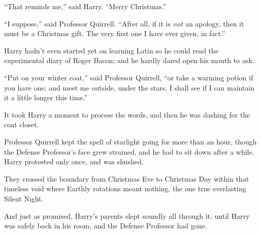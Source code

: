 “That reminds me,” said Harry. “Merry Christmas.”

“I suppose,” said Professor Quirrell. “After all, if it is \emph{not} an apology, then it must be a Christmas gift. The very first one I have ever given, in fact.”

Harry hadn’t even started yet on learning Latin so he could read the experimental diary of Roger Bacon; and he hardly dared open his mouth to ask.

“Put on your winter coat,” said Professor Quirrell, “or take a warming potion if you have one; and meet me outside, under the stars. I shall see if I can maintain it a little longer this time.”

It took Harry a moment to process the words, and then he was dashing for the coat closet.

Professor Quirrell kept the spell of starlight going for more than an hour, though the Defense Professor’s face grew strained, and he had to sit down after a while. Harry protested only once, and was shushed.

They crossed the boundary from Christmas Eve to Christmas Day within that timeless void where Earthly rotations meant nothing, the one true everlasting Silent Night.

And just as promised, Harry’s parents slept soundly all through it, until Harry was safely back in his room, and the Defense Professor had gone.

